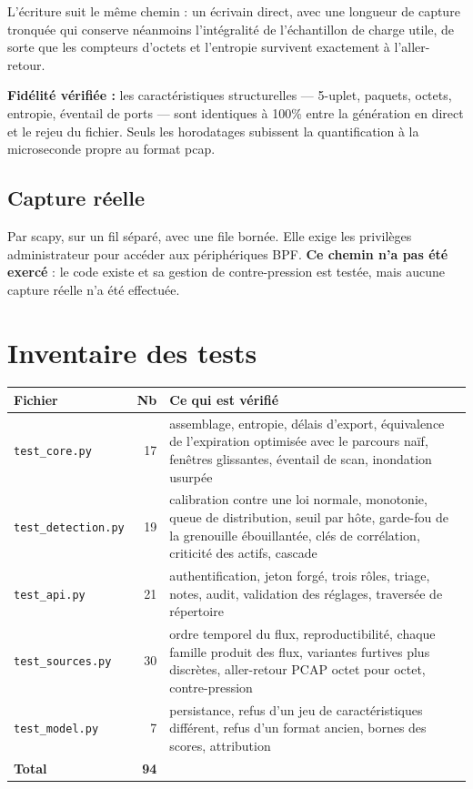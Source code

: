 \documentclass[11pt,a4paper]{article}
\begin{document}
L'écriture suit le même chemin : un écrivain direct, avec une longueur de capture tronquée qui
conserve néanmoins l'intégralité de l'échantillon de charge utile, de sorte que les compteurs
d'octets et l'entropie survivent exactement à l'aller-retour.

\textbf{Fidélité vérifiée :} les caractéristiques structurelles --- 5-uplet, paquets, octets,
entropie, éventail de ports --- sont identiques à 100\% entre la génération en direct et le rejeu du
fichier. Seuls les horodatages subissent la quantification à la microseconde propre au format pcap.

\subsection{Capture réelle}

Par scapy, sur un fil séparé, avec une file bornée. Elle exige les privilèges administrateur pour
accéder aux périphériques BPF. \textbf{Ce chemin n'a pas été exercé} : le code existe et sa gestion
de contre-pression est testée, mais aucune capture réelle n'a été effectuée.

\section{Inventaire des tests}

\begin{table}[h]\centering\small
\begin{tabularx}{\linewidth}{@{}l r X@{}}
\toprule
\textbf{Fichier} & \textbf{Nb} & \textbf{Ce qui est vérifié} \\
\midrule
\texttt{test\_core.py} & 17 & assemblage, entropie, délais d'export, équivalence de l'expiration
optimisée avec le parcours naïf, fenêtres glissantes, éventail de scan, inondation usurpée \\
\texttt{test\_detection.py} & 19 & calibration contre une loi normale, monotonie, queue de
distribution, seuil par hôte, garde-fou de la grenouille ébouillantée, clés de corrélation,
criticité des actifs, cascade \\
\texttt{test\_api.py} & 21 & authentification, jeton forgé, trois rôles, triage, notes, audit,
validation des réglages, traversée de répertoire \\
\texttt{test\_sources.py} & 30 & ordre temporel du flux, reproductibilité, chaque famille produit
des flux, variantes furtives plus discrètes, aller-retour PCAP octet pour octet, contre-pression \\
\texttt{test\_model.py} & 7 & persistance, refus d'un jeu de caractéristiques différent, refus d'un
format ancien, bornes des scores, attribution \\
\midrule
\textbf{Total} & \textbf{94} & \\
\bottomrule
\end{tabularx}
\end{table}
\end{document}
